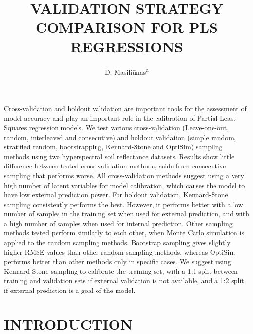 \documentclass{isprs}
\begin{document}
\title{VALIDATION STRATEGY COMPARISON FOR PLS REGRESSIONS}

\author{
 D. Masili\=unas\textsuperscript{a}}

\address
{
	\textsuperscript{a }Wageningen University, Droevendaalsesteeg 3, NL 6708 PB, Wageningen, The Netherlands - dainius.masiliunas@wur.nl
}

\icwg{}   %

\abstract
{
Cross-validation and holdout validation are important tools for the assessment of model accuracy and play an important role in the calibration of Partial Least Squares regression models. We test various cross-validation (Leave-one-out, random, interleaved and consecutive) and holdout validation (simple random, stratified random, bootstrapping, Kennard-Stone and OptiSim) sampling methods using two hyperspectral soil reflectance datasets. Results show little difference between tested cross-validation methods, aside from consecutive sampling that performs worse. All cross-validation methods suggest using a very high number of latent variables for model calibration, which causes the model to have low external prediction power. For holdout validation, Kennard-Stone sampling consistently performs the best. However, it performs better with a low number of samples in the training set when used for external prediction, and with a high number of samples when used for internal prediction. Other sampling methods tested perform similarly to each other, when Monte Carlo simulation is applied to the random sampling methods. Bootstrap sampling gives slightly higher RMSE values than other random sampling methods, whereas OptiSim performs better than other methods only in specific cases. We suggest using Kennard-Stone sampling to calibrate the training set, with a 1:1 split between training and validation sets if external validation is not available, and a 1:2 split if external prediction is a goal of the model.
}


\maketitle

\section{INTRODUCTION}\label{INTRODUCTION}
\end{document}

